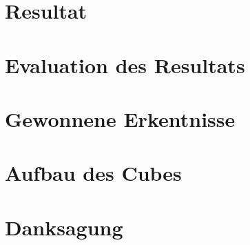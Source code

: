 \documentclass{article}
\begin{document}
\section{Resultat}

\section{Evaluation des Resultats}

\section{Gewonnene Erkentnisse}

\section{Aufbau des Cubes}

\section{Danksagung}



\end{document}
